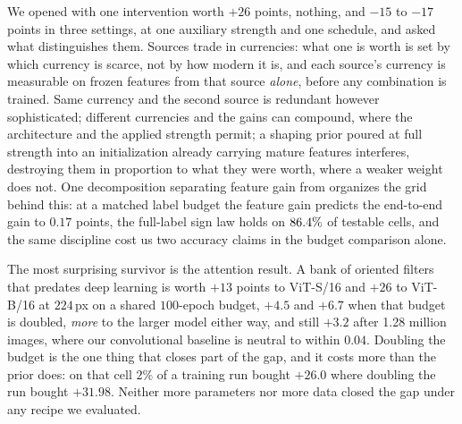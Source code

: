  We opened with one intervention worth $+26$ points, nothing, and $-15$ to $-17$ points
in three settings, at one auxiliary strength and one schedule, and asked what
distinguishes them. Sources trade in currencies: what one is worth is set by
which currency is scarce, not by how modern it is, and each source's
currency is measurable on frozen features from that source \emph{alone}, before
any combination is trained. Same currency and the second source is redundant
however sophisticated; different currencies and the gains can compound, where
the architecture and the applied strength permit; a shaping
prior poured at full strength into an initialization already carrying mature
features interferes, destroying them in proportion to what they were worth,
where a weaker
weight does not. One decomposition separating feature gain from \readout{}
organizes the grid behind this: at a matched label budget the feature gain
predicts the end-to-end gain to $0.17$ points, the full-label sign law holds
on $86.4\%$ of testable
cells, and the same discipline cost us two accuracy claims in the budget
comparison alone.

The most surprising survivor is the attention result. A bank of oriented
filters that predates deep learning is worth $+13$ points to ViT-S/16 and $+26$
to ViT-B/16 at $224$\,px on a shared $100$-epoch budget, $+4.5$ and $+6.7$ when
that budget is doubled, \emph{more} to the larger model either way, and still
$+3.2$ after 1.28 million images, where our convolutional baseline is neutral
to within $0.04$. Doubling the budget is the
one thing that closes part of the gap, and it costs more than the prior
does: on that cell $2\%$ of a training
run bought $+26.0$ where doubling the run bought $+31.98$. Neither more
parameters nor more data closed the gap under any recipe we evaluated.

